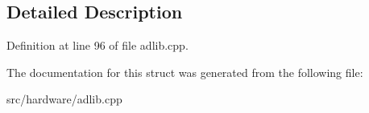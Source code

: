 \subsection{Detailed Description}


Definition at line 96 of file adlib.\-cpp.



The documentation for this struct was generated from the following file\-:\begin{DoxyCompactItemize}
\item 
src/hardware/adlib.\-cpp\end{DoxyCompactItemize}

